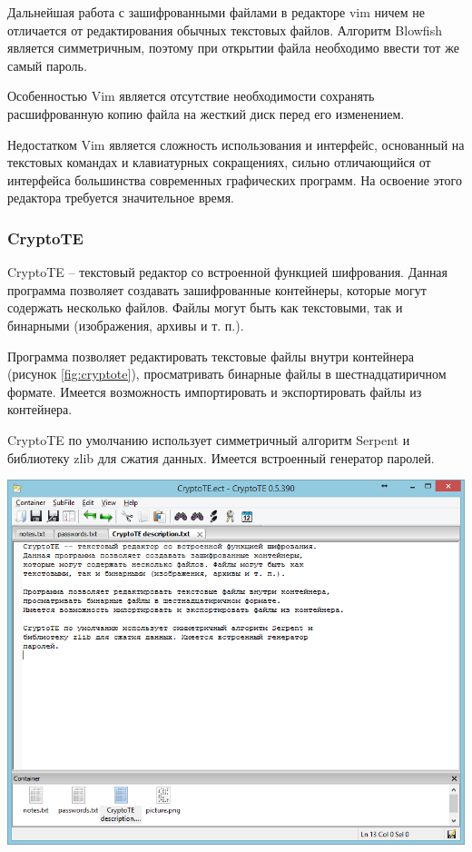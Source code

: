 Дальнейшая работа с зашифрованными файлами в редакторе vim ничем
не отличается от редактирования обычных текстовых файлов. Алгоритм
Blowfish является симметричным, поэтому при открытии файла необходимо
ввести тот же самый пароль.

Особенностью Vim является отсутствие необходимости сохранять
расшифрованную копию файла на жесткий диск перед его изменением.

Недостатком Vim является сложность использования и интерфейс, основанный на текстовых командах и
клавиатурных сокращениях, сильно отличающийся от интерфейса большинства современных графических программ.
На освоение этого редактора требуется значительное время.

\newpage
\subsubsection{CryptoTE}


CryptoTE -- текстовый редактор со встроенной функцией шифрования.
Данная программа позволяет создавать зашифрованные контейнеры,
которые могут содержать несколько файлов. Файлы могут быть как
текстовыми, так и бинарными (изображения, архивы и т. п.).

Программа позволяет редактировать текстовые файлы внутри контейнера
(рисунок \ref{fig:cryptote}), просматривать бинарные файлы
в шестнадцатиричном формате. Имеется возможность импортировать
и экспортировать файлы из контейнера.

CryptoTE по умолчанию использует симметричный алгоритм Serpent и
библиотеку zlib для сжатия данных. Имеется встроенный генератор
паролей.

\noindent
\begin{minipage}{\textwidth}
  \vspace{3.5mm}
  \centering
  \includegraphics[scale=0.6]{./pics/cryptote-main.png}
  \label{fig:cryptote}
  \vspace{3.5mm}
\end{minipage}

